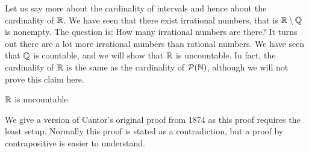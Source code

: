 Let us say more about the cardinality of intervals and hence about the
cardinality of ${\mathbb{R}}$.  We have seen that there exist irrational numbers, that is
${\mathbb{R}} \setminus {\mathbb{Q}}$ is nonempty.  The question is: How many irrational numbers
are there?  It turns out there are a lot more irrational numbers than rational
numbers.  We have seen that ${\mathbb{Q}}$ is countable, and we will show 
that ${\mathbb{R}}$ is uncountable.
In fact, the cardinality of ${\mathbb{R}}$ is the
same as the cardinality of ${\mathcal{P}}({\mathbb{N}})$, although we will not prove this
claim here.

\begin{thm}[Cantor]
${\mathbb{R}}$ is uncountable.
\end{thm}

We give a version of
Cantor's original proof from
1874 as this proof requires the least setup.  Normally this proof is stated
as a contradiction, but a proof by contrapositive is easier to
understand.

